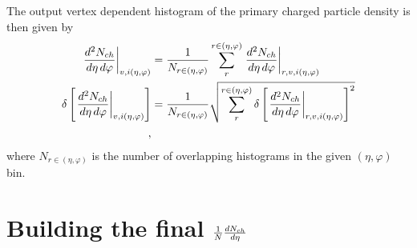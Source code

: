 \documentclass[11pt]{article}
\newcommand{\dndetadphi}[1][]{{\ensuremath%
    \ifx|#1|\else\left.\fi%
    \frac{d^2N_{ch}}{d\eta\,d\varphi}%
    \ifx|#1|\else\right|_{#1}\fi%
}}
\newcommand{\dndeta}[1][]{{\ensuremath%
    \ifx|#1|\else\left.\fi%
    \frac{1}{N}\frac{dN_{ch}}{d\eta}%
    \ifx|#1|\else\right|_{#1}\fi%
}}
\begin{document}
The output vertex dependent histogram of the primary
charged particle density is then given by
\begin{align}
  \dndetadphi[v,i(\eta,\varphi)] &=
  \frac{1}{N_{r\in(\eta,\varphi)}}\sum_{r}^{r\in(\eta,\varphi)}  
  \dndetadphi[r,v,i(\eta,\varphi)]\\
  \delta\left[\dndetadphi[v,i(\eta,\varphi)]\right] &=
  \frac{1}{N_{r\in(\eta,\varphi)}}\sqrt{\sum_{r}^{r\in(\eta,\varphi)}   
    \delta\left[\dndetadphi[r,v,i(\eta,\varphi)]\right]^2}\\
  \quad,
\end{align}
where $N_{r\in(\eta,\varphi)}$ is the number of overlapping histograms
in the given $(\eta,\varphi)$ bin. 


\section*{Building the final $\dndeta$}
\end{document}
